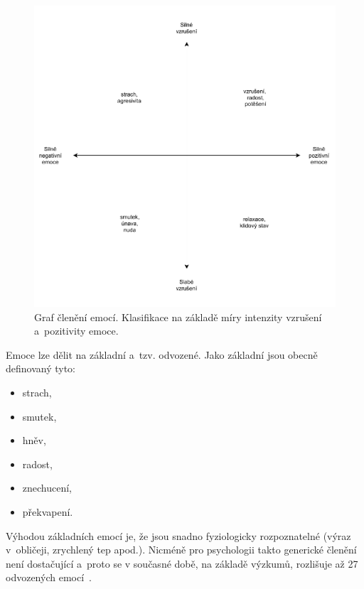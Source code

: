     
    \begin{figure}[H]
        \centering
        \includegraphics[scale=0.85]{obrazky-figures/emoce_graf.pdf}
        \caption{Graf členění emocí. Klasifikace na základě míry intenzity vzrušení a~pozitivity emoce.}
        \label{fig:emoce_graf}
    \end{figure}
    
    Emoce lze dělit na základní a~tzv. odvozené. Jako základní jsou obecně definovaný tyto:
    \begin{itemize}
        \item strach,
        \item smutek,
        \item hněv,
        \item radost,
        \item znechucení,
        \item překvapení.
    \end{itemize}
    
    Výhodou základních emocí je, že jsou snadno fyziologicky rozpoznatelné (výraz v~obličeji, zrychlený tep apod.). Nicméně pro psychologii takto generické členění není dostačující a~proto se v současné době, na základě výzkumů, rozlišuje až 27 odvozených emocí~\cite{Cowen201702247}.
    
   
    
